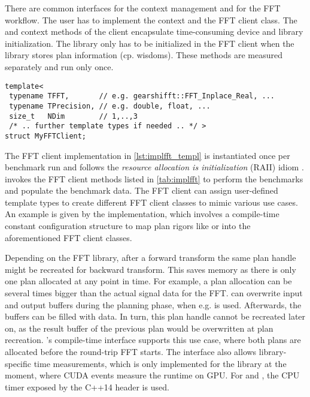 There are common interfaces for the context management and for the FFT workflow. The user has to implement the context and the FFT client class. The  and  context methods of the client encapsulate time-consuming device and library initialization. The library only has to be initialized in the FFT client when the library stores plan information (cp. \fftw{} wisdoms). These methods are measured separately and run only once. 

\begin{lstlisting}[caption={Required template arguments for FFT client implementation},label={lst:implfft_templ}]
template<
 typename TFFT,       // e.g. gearshifft::FFT_Inplace_Real, ...
 typename TPrecision, // e.g. double, float, ...
 size_t   NDim        // 1,..,3
 /* .. further template types if needed .. */ >
struct MyFFTClient;
\end{lstlisting}


The FFT client implementation in \cref{lst:implfft_templ} is instantiated once per benchmark run and follows the {\textit{resource allocation is initialization}} (RAII) idiom \cite{stroustrup1994design}. \gearshifft{} invokes the FFT client methods listed in \cref{tab:implfft} to perform the benchmarks and populate the benchmark data. The FFT client can assign user-defined template types to create different FFT client classes to mimic various use cases. An example is given by the \fftw{} implementation, which involves a compile-time constant configuration structure to map plan rigors like  or  into the aforementioned FFT client classes.

Depending on the FFT library, after a forward transform the same plan handle might be recreated for backward transform. This saves memory as there is only one plan allocated at any point in time. For example, a \cufft{} plan allocation can be several times bigger than the actual signal data for the FFT. \fftw{} can overwrite input and output buffers during the planning phase, when e.g.  is used. Afterwards, the buffers can be filled with data. In turn, this plan handle cannot be recreated later on, as the result buffer of the previous plan would be overwritten at plan recreation. \gearshifft{}'s compile-time interface supports this use case, where both plans are allocated before the round-trip FFT starts.
%
The \gearshifft{} interface also allows library-specific time measurements, which is only implemented for the \cufft{} library at the moment, where CUDA events measure the runtime on GPU. For \fftw{} and \clfft{}, the CPU timer exposed by the C++14  header is used.


